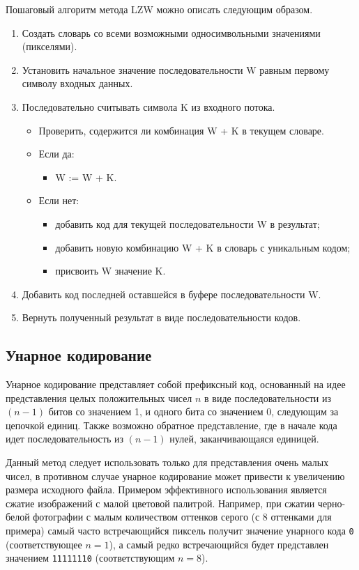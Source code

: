 Пошаговый алгоритм метода LZW можно описать следующим образом.
\begin{enumerate}
    \item Создать словарь со всеми возможными односимвольными значениями (пикселями).
    \item Установить начальное значение последовательности W равным первому символу входных данных.
    \item Последовательно считывать символа K из входного потока.
    \begin{itemize}
        \item Проверить, содержится ли комбинация W + K в текущем словаре.
        \item Если да:
        \begin{itemize}
            \item W := W + K.
        \end{itemize} 
        \item Если нет:
        \begin{itemize}
            \item добавить код для текущей последовательности W в результат;
            \item добавить новую комбинацию W + K в словарь с уникальным кодом;
            \item присвоить W значение K.
        \end{itemize}
    \end{itemize}
    \item Добавить код последней оставшейся в буфере последовательности W.
    \item Вернуть полученный результат в виде последовательности кодов.
\end{enumerate}

\subsection{Унарное кодирование}

Унарное кодирование \cite{UnaryEncoding} представляет собой префиксный код, основанный на идее представления целых положительных чисел $n$ в виде последовательности из $(n - 1)$ битов со значением 1, и одного бита со значением 0, следующим за цепочкой единиц. Также возможно обратное представление, где в начале кода идет последовательность из $(n - 1)$ нулей, заканчивающаяся единицей.

Данный метод следует использовать только для представления очень малых чисел, в противном случае унарное кодирование может привести к увеличению размера исходного файла. Примером эффективного использования является сжатие изображений с малой цветовой палитрой. Например, при сжатии черно-белой фотографии с малым количеством оттенков серого (с 8 оттенками для примера) самый часто встречающийся пиксель получит значение унарного кода \texttt{0} (соответствующее $n = 1$), а самый редко встречающийся будет представлен значением \texttt{11111110} (соответствующим $n = 8$).

